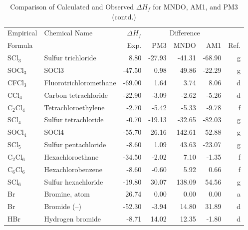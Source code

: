 \begin{table}
\caption{Comparison of Calculated and Observed $\Delta H_f$ 
for MNDO, AM1, and PM3 (contd.)}
\begin{center}
\compresstable
\begin{tabular}{llrrrrr}
Empirical & Chemical Name & $\Delta H_f$ & \multicolumn{3}{c}{Difference} & \\
Formula   &               & Exp. & PM3 &  MNDO  &  AM1 &     Ref.\\
\hline
 SCl$_3$        & Sulfur trichloride              &     8.80    &   -27.93  &   -41.31  &   -68.90  &      g\\
 SOCl$_3$       & SOCl3                           &   -47.50    &     0.98  &    49.86  &   -22.29  &      g\\
 CFCl$_3$       & Fluorotrichloromethane          &   -69.00    &     1.64  &     3.74  &     8.06  &      d\\
 CCl$_4$        & Carbon tetrachloride            &   -22.90    &    -3.09  &    -2.62  &    -5.26  &      d\\
 C$_2$Cl$_4$       & Tetrachloroethylene             &    -2.70    &    -5.42  &    -5.33  &    -9.78  &      f\\
 SCl$_4$        & Sulfur tetrachloride            &    -0.70    &   -19.13  &   -32.65  &   -82.03  &      g\\
 SOCl$_4$       & SOCl4                           &   -55.70    &    26.16  &   142.61  &    52.88  &      g\\
 SCl$_5$        & Sulfur pentachloride            &    -8.60    &     1.09  &    43.63  &   -23.07  &      g\\
 C$_2$Cl$_6$       & Hexachloroethane                &   -34.50    &    -2.02  &     7.10  &    -1.35  &      f\\
 C$_6$Cl$_6$       & Hexachlorobenzene               &    -8.60    &    -0.60  &     5.92  &     0.66  &      f\\
 SCl$_6$        & Sulfur hexachloride             &   -19.80    &    30.07  &   138.09  &    54.56  &      g\\
 Br          & Bromine, atom                   &    26.74    &     0.00  &     0.00  &     0.00  &      a\\
 Br          & Bromide (--)                     &   -52.30    &    -3.94  &    14.80  &    31.89  &      d\\
 HBr         & Hydrogen bromide                &    -8.71    &    14.02  &    12.35  &    -1.80  &      d\\

\end{tabular}
\end{center}
\end{table}
